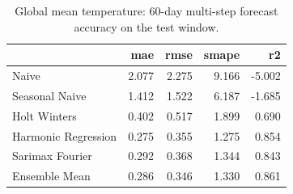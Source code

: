 \begin{table}
\caption{Global mean temperature: 60-day multi-step forecast accuracy on the test window.}
\label{tab:global_models}
\begin{tabular}{lrrrr}
\toprule
 & mae & rmse & smape & r2 \\
\midrule
Naive & 2.077 & 2.275 & 9.166 & -5.002 \\
Seasonal Naive & 1.412 & 1.522 & 6.187 & -1.685 \\
Holt Winters & 0.402 & 0.517 & 1.899 & 0.690 \\
Harmonic Regression & 0.275 & 0.355 & 1.275 & 0.854 \\
Sarimax Fourier & 0.292 & 0.368 & 1.344 & 0.843 \\
Ensemble Mean & 0.286 & 0.346 & 1.330 & 0.861 \\
\bottomrule
\end{tabular}
\end{table}
